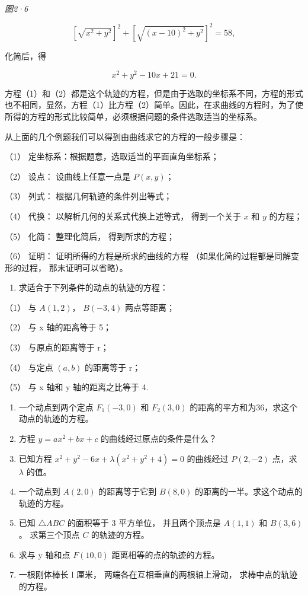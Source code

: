 \emph{图2·6}

\[
[\sqrt {x^{2} + y^{2}}] ^ {2} + [ \sqrt {(x - 10) ^ {2} + y^{2}} ] ^ {2} = 58,
\]

化简后，得

\[
x^{2} + y^{2} - 10 x + 21 = 0. \tag {2}
\]

方程（1）和（2）都是这个轨迹的方程，但是由于选取的坐标系不同，方程的形式也不相同，显然，方程（1）比方程（2）简单。因此，在求曲线的方程时，为了使所得的方程的形式比较简单，必须根据问题的条件选取适当的坐标系。

从上面的几个例题我们可以得到由曲线求它的方程的一般步骤是：

（1） 定坐标系：根据题意，选取适当的平面直角坐标系；

（2） 设点： 设曲线上任意一点是 \(P(x, y)\)；

（3） 列式： 根据几何轨迹的条件列出等式；

（4） 代换： 以解析几何的关系式代换上述等式， 得到一个关于 \(x\) 和
\(y\) 的方程；

（5） 化简： 整理化简后， 得到所求的方程；

（6） 证明： 证明所得的方程是所求的曲线的方程
（如果化简的过程都是同解变形的过程， 那末证明可以省略）。

\begin{enumerate}
\def\labelenumi{\arabic{enumi}.}
\tightlist
\item
  求适合于下列条件的动点的轨迹的方程：
\end{enumerate}

（1） 与 \(A(1, 2)\)， \(B(-3, 4)\) 两点等距离；

（2） 与 x 轴的距离等于 5；

（3） 与原点的距离等于 r；

（4） 与定点 \((a, b)\) 的距离等于 r；

（5） 与 x 轴和 y 轴的距离之比等于 4.

\begin{enumerate}
\def\labelenumi{\arabic{enumi}.}
\setcounter{enumi}{1}
\item
  一个动点到两个定点 \(F_{1}(-3,0)\) 和 \(F_{2}(3,0)\)
  的距离的平方和为36，求这个动点的轨迹的方程。
\item
  方程 \(y = ax^2 + bx + c\) 的曲线经过原点的条件是什么？
\item
  已知方程 \(x^{2} + y^{2} - 6x + \lambda (x^{2} + y^{2} + 4) = 0\)
  的曲线经过 \(P(2, -2)\) 点，求 \(\lambda\) 的值。
\item
  一个动点到 \(A(2,0)\) 的距离等于它到 \(B(8,0)\)
  的距离的一半。求这个动点的轨迹的方程。
\item
  已知 \(\triangle ABC\) 的面积等于 3 平方单位， 并且两个顶点是
  \(A(1,1)\) 和 \(B(3,6)\)。 求第三个顶点 \(C\) 的轨迹的方程。
\item
  求与 y 轴和点 \(F(10,0)\) 距离相等的点的轨迹的方程。
\item
  一根刚体棒长 l 厘米， 两端各在互相垂直的两根轴上滑动，
  求棒中点的轨迹的方程。
\end{enumerate}

